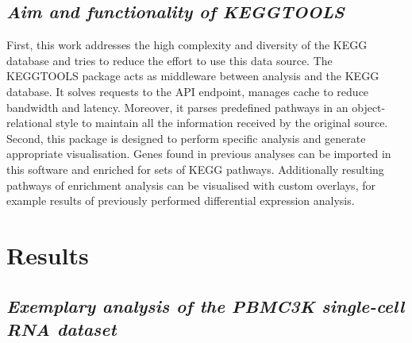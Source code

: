 \documentclass[11pt,a4paper]{article}
\begin{document}
\subsection*{\textit{Aim and functionality of KEGGTOOLS}}

First, this work addresses the high complexity and diversity of the KEGG database
and tries to reduce the effort to use this data source. The KEGGTOOLS package acts
as middleware between analysis and the KEGG database. It solves requests to the API
endpoint, manages cache to reduce bandwidth and latency. Moreover, it parses predefined pathways in
an object-relational style to maintain all the information received by the original
source. Second, this package is designed to perform specific analysis and generate appropriate visualisation. Genes
found in previous analyses can be imported in this software and enriched for sets
of KEGG pathways. Additionally resulting pathways of enrichment analysis can be
visualised with custom overlays, for example results of previously performed differential
expression analysis.


\section*{Results}

\subsection*{\textit{Exemplary analysis of the PBMC3K single-cell RNA dataset}}
\end{document}
